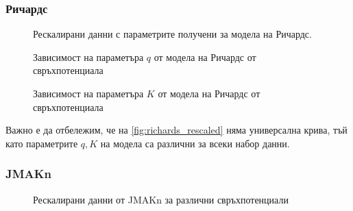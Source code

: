 \subsubsection{Ричардс}
\begin{figure}[hbpt]
    \centering
    \caption{Рескалирани данни с параметрите получени за модела на Ричардс.}
    \label{fig:richards_rescaled}
\end{figure}
\begin{figure}[H]
    \centering
    \caption{Зависимост на параметъра $q$ от модела на Ричардс от свръхпотенциала}
\end{figure}
\begin{figure}[H]
    \centering
    \caption{Зависимост на параметъра $K$ от модела на Ричардс от свръхпотенциала}
\end{figure}

Важно е да отбележим, че на \autoref{fig:richards_rescaled} няма универсална крива, тъй като параметрите $q, K$ на модела са различни за всеки набор данни.
\subsubsection{JMAKn}
\begin{figure}[H]
    \centering
    \caption{Рескалирани данни от JMAKn за различни свръхпотенциали}
\end{figure}

